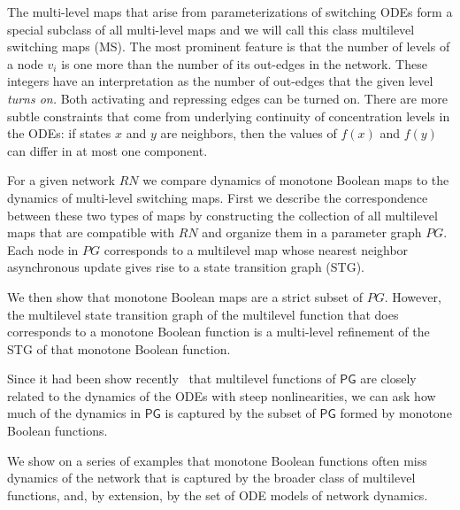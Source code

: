\documentclass[12pt, notitlepage]{amsart}
\theoremstyle{definition}
\newcommand{\PG}{\mathsf{PG}}
\begin{document}
The multi-level maps that arise from parameterizations of switching ODEs form a special subclass of all multi-level maps and we will call this class multilevel switching maps (MS).  The most prominent feature is that the number of levels of a node $v_i$ is one more than the number of its out-edges in the network. These integers have an  interpretation as the number of out-edges that the given level \textit{turns on.}  Both activating  and repressing edges can be turned on.   There are more subtle constraints that come from underlying continuity of concentration levels in the ODEs: if states $x$ and $y$ are neighbors, then the values of $f(x)$ and $f(y)$ can differ in at most one component.

For a given network $RN$ we compare dynamics of monotone Boolean maps to the dynamics of multi-level switching maps. First we describe the correspondence between these two types of maps by constructing  the collection of all multilevel maps that are compatible with $RN$ and  organize them in a parameter graph $PG$. Each node in $PG$ corresponds to a multilevel map whose nearest neighbor asynchronous update gives rise to a state transition graph (STG).

We then show that monotone Boolean maps  are a strict subset of $PG$. However, the multilevel  state transition graph of the multilevel function  that does corresponds to a  monotone Boolean function  is a multi-level refinement of the STG  of that monotone Boolean function.

Since it had been show recently~\cite{rook_field:24} that multilevel functions of $\PG$ are closely related to the dynamics of the ODEs with steep nonlinearities, we can ask how much of the dynamics in $\PG$ is captured by the subset of $\PG$ formed by  monotone Boolean functions.

We show on a series of examples that monotone Boolean functions often miss dynamics of the network that is captured by the broader class of multilevel functions, and, by extension, by the set of ODE models of network dynamics.
\end{document}
